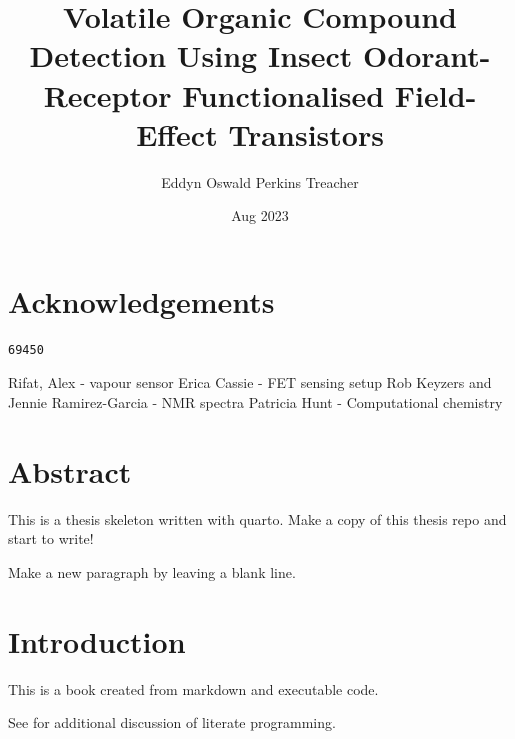 \documentclass[
  a4paper,
]{scrbook}
\title{Volatile Organic Compound Detection Using Insect Odorant-Receptor
Functionalised Field-Effect Transistors}
\author{Eddyn Oswald Perkins Treacher}
\date{Aug 2023}
\begin{document}
\frontmatter
\maketitle
\ifdefined\Shaded\renewenvironment{Shaded}{\begin{tcolorbox}[enhanced, borderline west={3pt}{0pt}{shadecolor}, sharp corners, breakable, interior hidden, boxrule=0pt, frame hidden]}{\end{tcolorbox}}\fi

\mainmatter
{}

\hypertarget{acknowledgements}{%
\chapter*{Acknowledgements}\label{acknowledgements}}


\begin{verbatim}
69450
\end{verbatim}

Rifat, Alex - vapour sensor Erica Cassie - FET sensing setup Rob Keyzers
and Jennie Ramirez-Garcia - NMR spectra Patricia Hunt - Computational
chemistry


\hypertarget{abstract}{%
\chapter*{Abstract}\label{abstract}}


This is a thesis skeleton written with quarto. Make a copy of this
thesis repo and start to write!

Make a new paragraph by leaving a blank line.

\newpage
\tableofcontents


\hypertarget{introduction}{%
\chapter{Introduction}\label{introduction}}

This is a book created from markdown and executable code.

See for additional discussion of literate programming.
\end{document}
